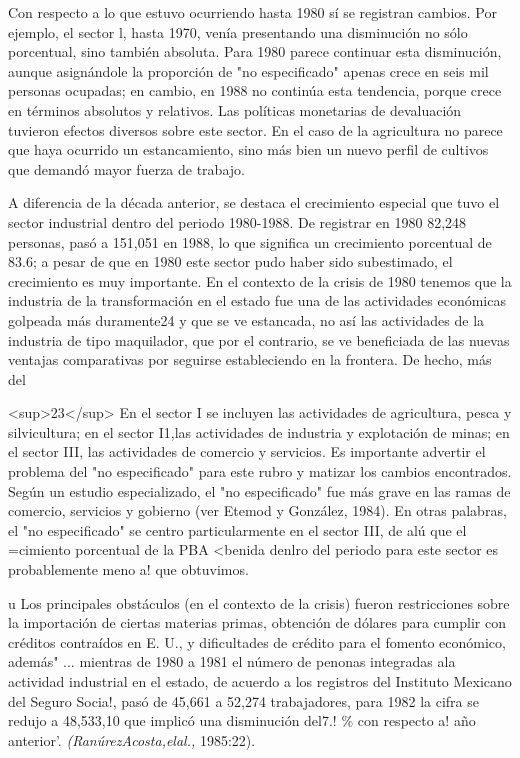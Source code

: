 \documentclass{article}
\begin{document}
Con respecto a lo que estuvo ocurriendo hasta 1980 sí se registran cambios. Por ejemplo, el sector l, hasta 1970, venía presentando una disminución no sólo porcentual, sino también absoluta. Para 1980 parece continuar esta disminución, aunque asignándole la proporción de "no especificado" apenas crece en seis mil personas ocupadas; en cambio, en 1988 no continúa esta tendencia, porque crece en términos absolutos y relativos. Las políticas monetarias de devaluación tuvieron efectos diversos sobre este sector. En el caso de la agricultura no parece que haya ocurrido un estancamiento, sino más bien un nuevo perfil de cultivos que demandó mayor fuerza de trabajo.

A diferencia de la década anterior, se destaca el crecimiento especial que tuvo el sector industrial dentro del periodo 1980-1988. De registrar en 1980 82,248 personas, pasó a 151,051 en 1988, lo que significa un crecimiento porcentual de 83.6; a pesar de que en 1980 este sector pudo haber sido subestimado, el crecimiento es muy importante. En el contexto de la crisis de 1980 tenemos que la industria de la transformación en el estado fue una de las actividades económicas golpeada más duramente24 y que se ve estancada, no así las actividades de la industria de tipo maquilador, que por el contrario, se ve beneficiada de las nuevas ventajas comparativas por seguirse estableciendo en la frontera. De hecho, más del

<sup>23</sup> En el sector I se incluyen las actividades de agricultura, pesca y silvicultura; en el sector I1,las actividades de industria y explotación de minas; en el sector III, las actividades de comercio y servicios. Es importante advertir el problema del "no especificado" para este rubro y matizar los cambios encontrados. Según un estudio especializado, el "no especificado" fue más grave en las ramas de comercio, servicios y gobierno (ver Etemod y González, 1984). En otras palabras, el "no especificado" se centro particularmente en el sector III, de alú que el =cimiento porcentual de la PBA <benida denlro del periodo para este sector es probablemente meno a! que obtuvimos.

u Los principales obstáculos (en el contexto de la crisis) fueron restricciones sobre la importación de ciertas materias primas, obtención de dólares para cumplir con créditos contraídos en E. U., y dificultades de crédito para el fomento económico, además" ... mientras de 1980 a 1981 el número de penonas integradas ala actividad industrial en el estado, de acuerdo a los registros del Instituto Mexicano del Seguro Socia!, pasó de 45,661 a 52,274 trabajadores, para 1982 la cifra se redujo a 48,533,10 que implicó una disminución del7.! \% con respecto a! año anterior'. \textit{(RanúrezAcosta,elal.,} 1985:22).
\end{document}
